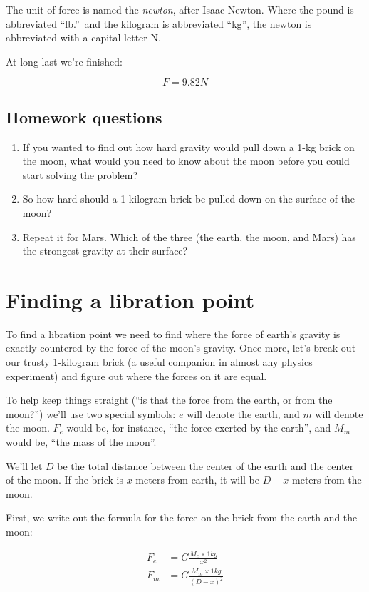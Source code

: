 \documentclass[10pt,twocolumn,letterpaper,preprint]{article}
\begin{document}
The unit of force is named the \textit{newton}, after Isaac Newton.  Where
the pound is abbreviated ``lb.''\ and the kilogram is abbreviated ``kg'', the
newton is abbreviated with a capital letter N.

At long last we're finished:

\[
F = 9.82 N
\]

\subsection{Homework questions}
\begin{enumerate}
\item
If you wanted to find out how hard gravity would pull down a 1-kg brick on
the moon, what would you need to know about the moon before you could start
solving the problem?
\item
So how hard should a 1-kilogram brick be pulled down on the surface of the moon?
\item
Repeat it for Mars.  Which of the three (the earth, the moon, and Mars) has the
strongest gravity at their surface?
\end{enumerate}

\section{Finding a libration point}

To find a libration point we need to find where the force of earth's gravity is
exactly countered by the force of the moon's gravity.  Once more, let's break
out our trusty 1-kilogram brick (a useful companion in almost any physics
experiment) and figure out where the forces on it are equal.

To help keep things straight (``is that the force from the earth, or from the
moon?'') we'll use two special symbols: $e$ will denote the earth, and
$m$ will denote the moon.  $F_{e}$ would be, for instance, ``the force
exerted by the earth'', and $M_{m}$ would be, ``the mass of the moon''.

We'll let $D$ be the total distance between the center of the earth and the center of
the moon.  If the brick is $x$ meters from earth, it will be $D-x$ meters from
the moon.

First, we write out the formula for the force on the brick from the earth and
the moon:

\begin{align*}
F_{e} &= G\frac{M_{e} \times 1kg}{x^2}\\
F_{m} &= G\frac{M_{m} \times 1kg}{(D-x)^2}
\end{align*}
\end{document}
